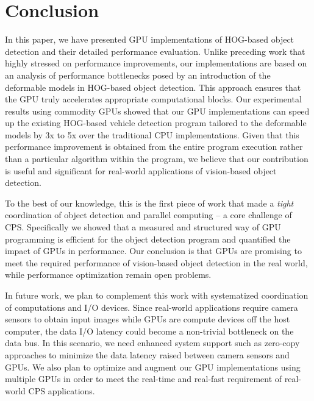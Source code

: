 \section{Conclusion}
\label{sec:conclusion}

In this paper, we have presented GPU implementations of HOG-based object
detection and their detailed performance evaluation.
Unlike preceding work that highly stressed on performance improvements,
our implementations are based on an analysis of performance bottlenecks
posed by an introduction of the deformable models in HOG-based object
detection.
This approach ensures that the GPU truly accelerates appropriate
computational blocks.
Our experimental results using commodity GPUs showed that our GPU
implementations can speed up the existing HOG-based vehicle detection
program tailored to the deformable models by 3x to 5x over the
traditional CPU implementations.
Given that this performance improvement is obtained from the entire
program execution rather than a particular algorithm within the program,
we believe that our contribution is useful and significant for
real-world applications of vision-based object detection.

To the best of our knowledge, this is the first piece of work that made
a \textit{tight} coordination of object detection and parallel computing
-- a core challenge of CPS.
Specifically we showed that a measured and structured way of GPU
programming is efficient for the object detection program and quantified
the impact of GPUs in performance.
Our conclusion is that GPUs are promising to meet the required
performance of vision-based object detection in the real world, while
performance optimization remain open problems.

In future work, we plan to complement this work with systematized
coordination of computations and I/O devices.
Since real-world applications require camera sensors to obtain input
images while GPUs are compute devices off the host computer, the data
I/O latency could become a non-trivial bottleneck on the data bus.
In this scenario, we need enhanced system support such as zero-copy
approaches \cite{Kato13} to minimize the data latency raised between
camera sensors and GPUs.
We also plan to optimize and augment our GPU implementations using
multiple GPUs in order to meet the real-time and real-fast requirement
of real-world CPS applications.
